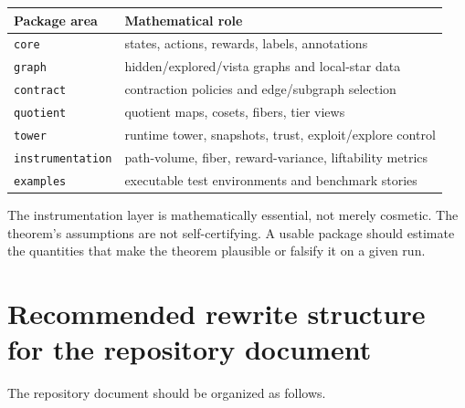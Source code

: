 \documentclass[11pt]{article}
\begin{document}
\begin{center}
\begin{tabular}{@{}ll@{}}
\toprule
Package area & Mathematical role \\
\midrule
\texttt{core} & states, actions, rewards, labels, annotations \\
\texttt{graph} & hidden/explored/vista graphs and local-star data \\
\texttt{contract} & contraction policies and edge/subgraph selection \\
\texttt{quotient} & quotient maps, cosets, fibers, tier views \\
\texttt{tower} & runtime tower, snapshots, trust, exploit/explore control \\
\texttt{instrumentation} & path-volume, fiber, reward-variance, liftability metrics \\
\texttt{examples} & executable test environments and benchmark stories \\
\bottomrule
\end{tabular}
\end{center}

The instrumentation layer is mathematically essential, not merely cosmetic.  The theorem's assumptions are not self-certifying.  A usable package should estimate the quantities that make the theorem plausible or falsify it on a given run.

\section{Recommended rewrite structure for the repository document}

The repository document should be organized as follows.
\end{document}
